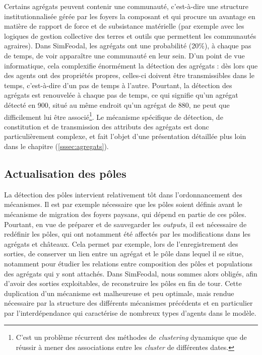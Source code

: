 Certains agrégats peuvent contenir une \og communauté\fg{}, c'est-à-dire une structure institutionnalisée gérée par les foyers la composant et qui procure un avantage en matière de rapport de force et de subsistance matérielle (par exemple avec les logiques de gestion collective des terres et outils que permettent les communautés agraires).
Dans SimFeodal, les agrégats ont une probabilité (20\%), à chaque pas de temps, de voir apparaître une communauté en leur sein.
D'un point de vue informatique, cela complexifie énormément la détection des agrégats : dès lors que des agents ont des propriétés propres, celles-ci doivent être transmissibles dans le temps, c'est-à-dire d'un pas de temps à l'autre.
Pourtant, la détection des agrégats est renouvelée à chaque pas de temps, ce qui signifie qu'un agrégat détecté en 900, situé au même endroit qu'un agrégat de 880, ne peut que difficilement lui être associé\footnote{C'est un problème récurrent des méthodes de \textit{clustering} dynamique que de réussir à mener des associations entre les \textit{cluster} de différentes dates.}.
Le mécanisme spécifique de détection, de constitution et de transmission des attributs des agrégats est donc particulièrement complexe, et fait l'objet d'une présentation détaillée plus loin dans le chapitre (\cref{sssec:agregats}).

\subsection{Actualisation des pôles}

La détection des pôles intervient relativement tôt dans l'ordonnancement des mécanismes.
Il est par exemple nécessaire que les pôles soient définis avant le mécanisme de migration des foyers paysans, qui dépend en partie de ces pôles.
Pourtant, en vue de préparer et de sauvegarder les \textit{outputs}, il est nécessaire de redéfinir les pôles, qui ont notamment été affectés par les modifications dans les agrégats et châteaux.
Cela permet par exemple, lors de l'enregistrement des sorties, de conserver un lien entre un agrégat et le pôle dans lequel il se situe, notamment pour étudier les relations entre composition des pôles et populations des agrégats qui y sont attachés.
Dans SimFeodal, nous sommes alors obligés, afin d'avoir des sorties exploitables, de reconstruire les pôles en fin de tour.
Cette duplication d'un mécanisme est malheureuse et peu optimale, mais rendue nécessaire par la structure des différents mécanismes précédents et en particulier par l'interdépendance qui caractérise de nombreux types d'agents dans le modèle.

